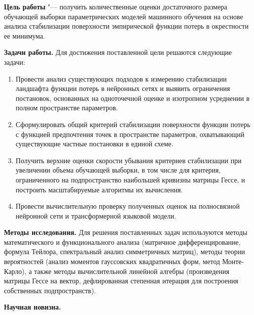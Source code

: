 \textbf{Цель работы} "--- получить количественные оценки достаточного размера обучающей выборки параметрических моделей машинного обучения на основе анализа стабилизации поверхности эмпирической функции потерь в окрестности ее минимума.

\textbf{Задачи работы.} Для достижения поставленной цели решаются следующие задачи:

\begin{enumerate}
    \item Провести анализ существующих подходов к измерению стабилизации ландшафта функции потерь в нейронных сетях и выявить ограничения постановок, основанных на одноточечной оценке и изотропном усреднении в полном пространстве параметров.
    \item Сформулировать общий критерий стабилизации поверхности функции потерь с функцией предпочтения точек в пространстве параметров, охватывающий существующие частные постановки в единой схеме.
    \item Получить верхние оценки скорости убывания критериев стабилизации при увеличении объема обучающей выборки, в том числе для критерия, ограниченного на подпространство наибольшей кривизны матрицы Гессе, и построить масштабируемые алгоритмы их вычисления.
    \item Провести вычислительную проверку полученных оценок на полносвязной нейронной сети и трансформерной языковой модели.
\end{enumerate}

\textbf{Методы исследования.} Для решения поставленных задач используются методы математического и функционального анализа (матричное дифференцирование, формула Тейлора, спектральный анализ симметричных матриц), методы теории вероятностей (анализ моментов гауссовских квадратичных форм, метод Монте-Карло), а также методы вычислительной линейной алгебры (произведения матрицы Гессе на вектор, дефлированная степенная итерация для построения собственных подпространств).

\textbf{Научная новизна.}

